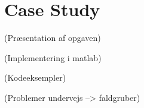 \documentclass[Main]{subfiles}
\begin{document}
\section{Case Study}

(Præsentation af opgaven)

(Implementering i matlab)

(Kodeeksempler)

(Problemer undervejs --> faldgruber)
\end{document}
